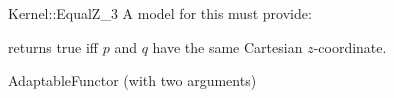 \begin{ccRefFunctionObjectConcept}{Kernel::EqualZ_3}
A model for this must provide:


{returns true iff $p$ and $q$ have the same Cartesian $z$-coordinate.}

\ccRefines
AdaptableFunctor (with two arguments)

\ccSeeAlso
{}\\

\end{ccRefFunctionObjectConcept}
